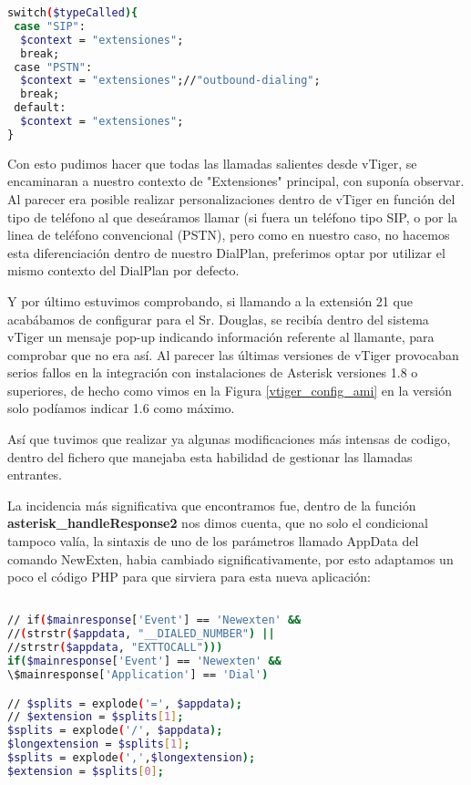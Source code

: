 \begin{lstlisting}[language=bash,title={./www/vtigercrm/modules/PBXManager/utils/AsteriskClass.php}]
switch($typeCalled){
 case "SIP":
  $context = "extensiones";
  break;
 case "PSTN":
  $context = "extensiones";//"outbound-dialing";
  break;
 default:
  $context = "extensiones";
}
\end{lstlisting}

Con esto pudimos hacer que todas las llamadas salientes desde vTiger, se encaminaran a nuestro contexto de "Extensiones" principal, con suponía observar. Al parecer era posible realizar personalizaciones dentro de vTiger en función del tipo de teléfono al que deseáramos llamar (si fuera un teléfono tipo SIP, o por la linea de teléfono convencional (PSTN), pero como en nuestro caso, no hacemos esta diferenciación dentro de nuestro DialPlan, preferimos optar por utilizar el mismo contexto del DialPlan por defecto.

Y por último estuvimos comprobando, si llamando a la extensión 21 que acabábamos de configurar para el Sr. Douglas, se recibía dentro del sistema vTiger un mensaje pop-up indicando información referente al llamante, para comprobar que no era así. Al parecer las últimas versiones de vTiger provocaban serios fallos en la integración con instalaciones de Asterisk versiones 1.8 o superiores, de hecho como vimos en la Figura \ref{vtiger_config_ami} en la versión solo podíamos indicar 1.6 como máximo. 

Así que tuvimos que realizar ya algunas modificaciones más intensas de codigo, dentro del fichero que manejaba esta habilidad de gestionar las llamadas entrantes.

La incidencia más significativa que encontramos fue, dentro de la función \textbf{asterisk\_handleResponse2} nos dimos cuenta, que no solo el condicional tampoco valía, la sintaxis de uno de los parámetros llamado AppData del comando NewExten, habia cambiado significativamente, por esto adaptamos un poco el código PHP para que sirviera para esta nueva aplicación:

\begin{lstlisting}[language=bash,title={./www/vtigercrm/cron/modules/PBXManager/AsteriskClient.php}]

// if($mainresponse['Event'] == 'Newexten' && 
//(strstr($appdata, "__DIALED_NUMBER") || 
//strstr($appdata, "EXTTOCALL")))
if($mainresponse['Event'] == 'Newexten' && 
\$mainresponse['Application'] == 'Dial')

// $splits = explode('=', $appdata);
// $extension = $splits[1];
$splits = explode('/', $appdata); 
$longextension = $splits[1];
$splits = explode(',',$longextension);
$extension = $splits[0];

\end{lstlisting}

